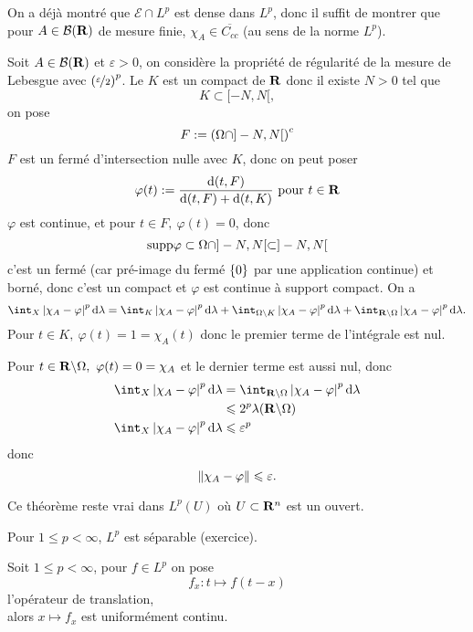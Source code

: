 \documentclass[a4paper,11pt, twoside]{article}
\begin{document}
\begin{Proof}
  On a déjà montré que $\mathcal E\cap L^p$ est dense dans $L^p$, donc il suffit de montrer que pour $A\in \mathcal B(\mathbf R)$ de mesure finie, $\chi_A\in\overline{C_{cc}}$ (au sens de la norme $L^p$).

  Soit $A\in \mathcal B(\mathbf R)$ et $\varepsilon>0$, on considère la propriété de régularité de la mesure de Lebesgue avec $\left(\displaystyle\nicefrac{\varepsilon}{2}\right)^p$. Le $K$ est un compact de $\mathbf R$ donc il existe $N>0$ tel que 
  $$K\subset [-N,N[,$$
  on pose 
  $$F:=\left(\Omega\cap]-N,N[\right)^c$$
  $F$ est un fermé d'intersection nulle avec $K$, donc on peut poser 
  $$\varphi (t):=\frac{\mathrm d(t,F)}{\mathrm d(t,F)+\mathrm d(t,K)}\text{ pour }t\in \mathbf R$$
  $\varphi$ est continue, et pour $t\in F,\ \varphi(t)=0$, donc 
  $$\mathrm{supp}\varphi\subset \Omega\cap ]-N,N[\subset ]-N,N[$$
  c'est un fermé (car pré-image du fermé $\left\{0\right\}$ par une application continue) et borné, donc c'est un compact et $\varphi$ est continue à support compact.
  On a 
  $$\int_X\abs{\chi_A-\varphi}^p\mathrm d\lambda=\int_K\abs{\chi_A-\varphi}^p\mathrm d\lambda+\int_{\O\backslash K}\abs{\chi_A-\varphi}^p\mathrm d\lambda+\int_{\R\backslash \O}\abs{\chi_A-\varphi}^p\mathrm d\lambda.$$ 
  Pour $t\in K,\ \varphi(t)=1=\chi_A(t)$ donc le premier terme de l'intégrale est nul.

  Pour $t\in \R\backslash\O,\ \varphi(t)=0=\chi_A$ et le dernier terme est aussi nul, donc 
  \begin{align*}
    \int_X\abs{\chi_A-\varphi}^p\mathrm d\lambda&=\int_{\R\backslash \O}\abs{\chi_A-\varphi}^p\mathrm d\lambda\\
    &\leqslant 2^p\lambda(\R\backslash\O)\\
    \int_X\abs{\chi_A-\varphi}^p\mathrm d\lambda&\leqslant \varepsilon^p
  \end{align*}
  donc 
  $$\left\lVert\chi_A-\varphi\right\rVert\leqslant \varepsilon.$$
\end{Proof}


\begin{RQ}
  Ce théorème reste vrai dans $L^p(U)$ où $U\subset\mathbf R^n$ est un ouvert.
\end{RQ}


\begin{RQ}
  Pour $1\leqslant p< \infty$, $L^p$ est séparable (exercice).
\end{RQ}


\begin{Th}
  Soit $1\leqslant p< \infty$, pour $f\in L^p$ on pose 
  $$f_x:t\longmapsto f(t-x)$$
  l'opérateur de translation,\\

  alors $x\longmapsto f_x$ est uniformément continu.
\end{Th}
\end{document}
